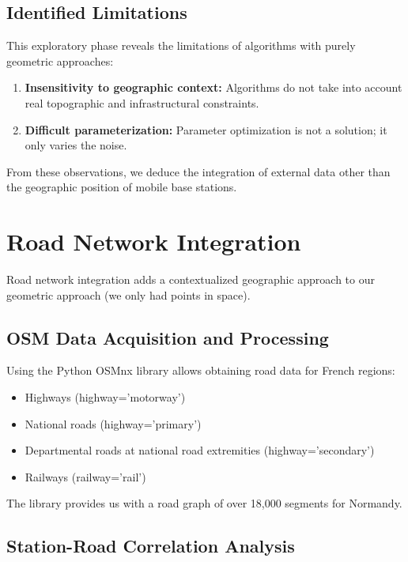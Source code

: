 \documentclass[12pt,a4paper]{report}
\begin{document}
\subsection{Identified Limitations}

This exploratory phase reveals the limitations of algorithms with purely geometric approaches:

\begin{enumerate}
    \item \textbf{Insensitivity to geographic context:} Algorithms do not take into account real topographic and infrastructural constraints.
    \item \textbf{Difficult parameterization:} Parameter optimization is not a solution; it only varies the noise.
\end{enumerate}

From these observations, we deduce the integration of external data other than the geographic position of mobile base stations.

\section{Road Network Integration}

Road network integration adds a contextualized geographic approach to our geometric approach (we only had points in space).

\subsection{OSM Data Acquisition and Processing}

Using the Python OSMnx library allows obtaining road data for French regions:
\begin{itemize}
    \item Highways (highway='motorway')
    \item National roads (highway='primary')
    \item Departmental roads at national road extremities (highway='secondary')
    \item Railways (railway='rail')
\end{itemize}

The library provides us with a road graph of over 18,000 segments for Normandy.

\subsection{Station-Road Correlation Analysis}
\end{document}
